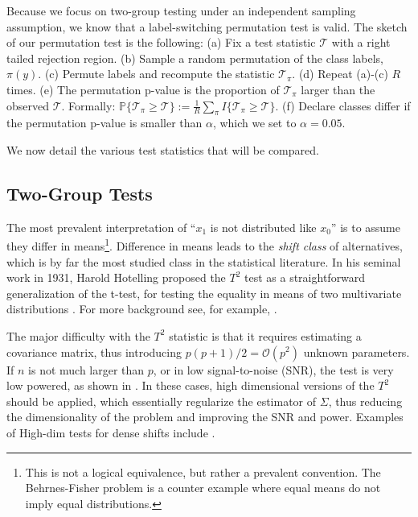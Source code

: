 \documentclass[onecolumn,draftclsnofoot]{IEEEtran}
\begin{document}
Because we focus on two-group testing under an independent sampling assumption, we know that a label-switching permutation test is valid. 
The sketch of our permutation test is the following: \newline
(a) Fix a test statistic $\mathcal{T}$ with a right tailed rejection region. \newline
(b) Sample a random permutation of the class labels, $\pi(y)$. \newline
(c) Permute labels and recompute the statistic $\mathcal{T}_\pi$. \newline
(d) Repeat (a)-(c) $R$ times. \newline
(e) The permutation p-value is the proportion of  $\mathcal{T}_\pi$ larger than the observed $\mathcal{T}$. Formally: 
$\mathbb{P}\{\mathcal{T}_\pi \geq \mathcal{T}\}:=\frac{1}{R} \sum_{\pi} I\{\mathcal{T}_\pi \geq \mathcal{T}\}$.\newline
(f) Declare classes differ if the permutation p-value is smaller than $\alpha$, which we set to $\alpha=0.05$.
\bigskip

We now detail the various test statistics that will be compared.


\subsection{Two-Group Tests}
The most prevalent interpretation of ``$x_1$ is not distributed like $x_0$'' is to assume they differ in means\footnote{This is not a logical equivalence, but rather a prevalent convention. The Behrnes-Fisher problem is a counter example where equal means do not imply equal distributions.}. 
Difference in means leads to the \emph{shift class} of alternatives, which is by far the most studied class in the statistical literature. 
In his seminal work in 1931, Harold Hotelling proposed the $T^2$ test as a straightforward generalization of the t-test, for testing the equality in means of two multivariate distributions \cite{hotelling_generalization_1931}. 
For more background see, for example, \cite{anderson_introduction_2003}.

The major difficulty with the $T^2$ statistic is that it requires estimating a covariance matrix, thus introducing $p(p+1)/2=\mathcal{O}(p^2)$ unknown parameters.
If $n$ is not much larger than $p$, or in low signal-to-noise (SNR), the test is very low powered, as shown in \cite{bai1996effect}. 
In these cases, high dimensional versions of the $T^2$ should be applied, which essentially regularize the estimator of $\Sigma$, thus reducing the dimensionality of the problem and improving the SNR and power.
Examples of High-dim tests for dense shifts include 
\cite{dempster1958high,bai1996effect,schafer_shrinkage_2005,goeman2006testing,srivastava_test_2008,chen_two-sample_2010,lopes2011more,ahmad2014u,thulin2014high,feng2015note}.
\end{document}
